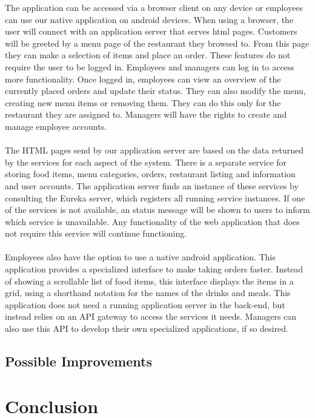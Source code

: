 \documentclass[12pt]{article}
\begin{document}
\begin{multicols}{2}
The application can be accessed via a browser client on any device or employees can use our native application on android devices. When using a browser, the user will connect with an application server that serves html pages. Customers will be greeted by a menu page of the restaurant they browsed to. From this page they can make a selection of items and place an order. These features do not require the user to be logged in. Employees and managers can log in to access more functionality. Once logged in, employees can view an overview of the currently placed orders and update their status. They can also modify the menu, creating new menu items or removing them. They can do this only for the restaurant they are assigned to. Managers will have the rights to create and manage employee accounts.
\\\\
The HTML pages send by our application server are based on the data returned by the services for each aspect of the system. There is a separate service for storing food items, menu categories, orders, restaurant listing and information and user accounts. The application server finds an instance of these services by consulting the Eureka server, which registers all running service instances. If one of the services is not available, an status message will be shown to users to inform which service is unavailable. Any functionality of the web application that does not require this service will continue functioning.
\\\\ 
Employees also have the option to use a native android application. This application provides a specialized interface to make taking orders faster. Instead of showing a scrollable list of food items, this interface displays the items in a grid, using a shorthand notation for the names of the drinks and meals. This application does not need a running application server in the back-end, but instead relies on an API gateway to access the services it needs. Managers can also use this API to develop their own specialized applications, if so desired.


\subsection{Possible Improvements}

\section{Conclusion}


\end{multicols}
\end{document}
